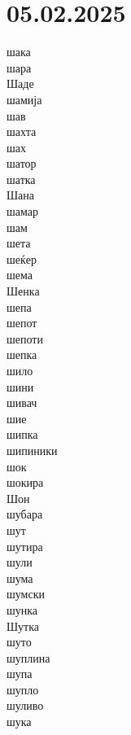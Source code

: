 \documentclass[a5paper,12pt]{article}
\newenvironment{activity}[1]{%
  \begin{tcolorbox}[colback=boxcolor,colframe=titlecolor,title={\textbf{#1}},fonttitle=\bfseries]
}{%
  \end{tcolorbox}
}
\begin{document}
\section{05.02.2025}
\begin{activity}{Зборчиња}
\begin{multicols}{4}
шака\\ шара\\ Шаде\\ шамија\\ шав\\ шахта\\ шах\\ шатор\\ шатка\\ Шана\\ шамар\\ шам\\ шета\\ шеќер\\ шема\\ Шенка\\ шепа\\ шепот\\ шепоти\\ шепка\\ шило\\ шини\\ шивач\\
шие\\ шипка\\ шипиники\\ шок\\ шокира\\ Шон\\ шубара\\ шут\\ шутира\\ шули\\ шума\\ шумски\\ шунка\\ Шутка\\ шуто\\ шуплина\\ шупа\\ шупло\\ шуливо\\ шука
\end{multicols}
\end{activity}
\end{document}
